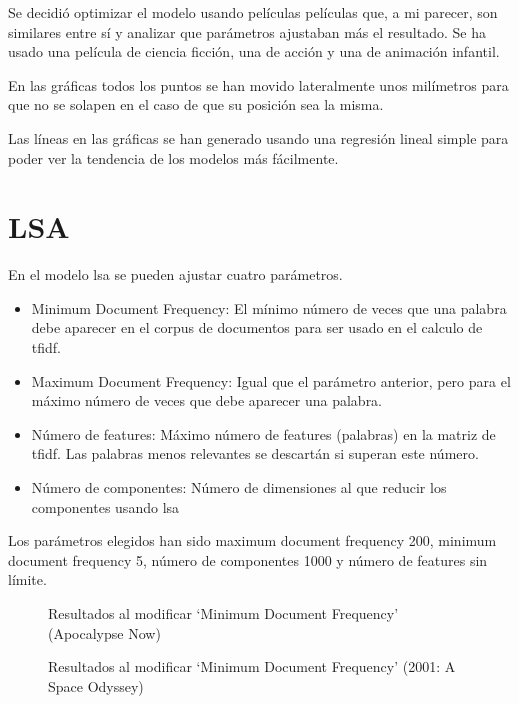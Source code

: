 \documentclass[withindex, glossary]{cam-thesis}
\begin{document}
Se decidió optimizar el modelo usando películas películas que, a mi parecer, son similares entre sí y analizar que parámetros ajustaban más el resultado. Se ha usado una película de ciencia ficción, una de acción y una de animación infantil.

En las gráficas todos los puntos se han movido lateralmente unos milímetros para que no se solapen en el caso de que su posición sea la misma.

Las líneas en las gráficas se han generado usando una regresión lineal simple para poder ver la tendencia de los modelos más fácilmente.

\section{LSA}
En el modelo \acrshort{lsa} se pueden ajustar cuatro parámetros.

\begin{itemize}
    \item Minimum Document Frequency: El mínimo número de veces que una palabra debe aparecer en el corpus de documentos para ser usado en el calculo de \acrshort{tfidf}.
    \item Maximum Document Frequency: Igual que el parámetro anterior, pero para el máximo número de veces que debe aparecer una palabra.
    \item Número de features: Máximo número de features (palabras) en la matriz de \acrshort{tfidf}. Las palabras menos relevantes se descartán si superan este número.
    \item Número de componentes: Número de dimensiones al que reducir los componentes usando \acrshort{lsa}
\end{itemize}

Los parámetros elegidos han sido maximum document frequency 200, minimum document frequency 5, número de componentes 1000 y número de features sin límite.

\newlength\figureheight{}
\newlength\figurewidth{}
\setlength{}
\setlength\figurewidth{\linewidth}
\begin{figure}[!htbp]
    \centering
    
    \caption{Resultados al modificar `Minimum Document Frequency' (Apocalypse Now)}
\end{figure}

\begin{figure}[!htbp]
    \centering
    
    \caption{Resultados al modificar `Minimum Document Frequency' (2001: A Space Odyssey)}
\end{figure}
\end{document}
